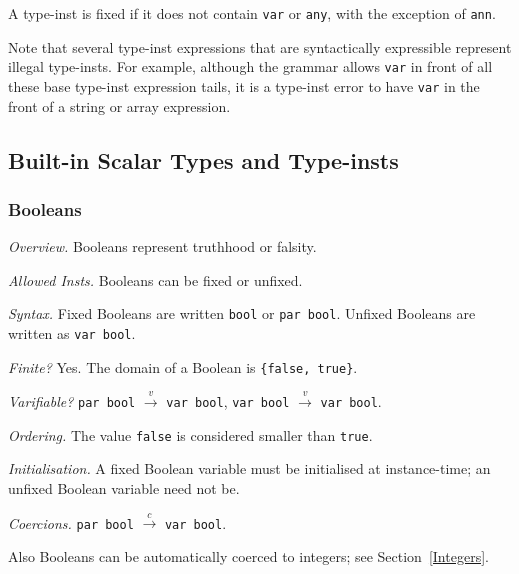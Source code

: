 \documentclass[10pt]{scrartcl}
\newcommand{\TyThing}[1]{\vspace{1.2mm}\noindent\emph{#1} }
\newcommand{\TyOverview}{\TyThing{Overview.}}
\newcommand{\TyInsts}{\TyThing{Allowed Insts.}}
\newcommand{\TySyntax}{\TyThing{Syntax.}}
\newcommand{\TyFiniteType}{\TyThing{Finite?}}
\newcommand{\TyVarifiable}{\TyThing{Varifiable?}}
\newcommand{\TyOrdering}{\TyThing{Ordering.}}
\newcommand{\TyInit}{\TyThing{Initialisation.}}
\newcommand{\TyCoercions}{\TyThing{Coercions.}}
\newcommand{\coerce}[2]{#1 $\stackrel{c}{\rightarrow}$ #2}
\newcommand{\varify}[2]{#1 $\stackrel{v}{\rightarrow}$ #2}
\begin{document}
A type-inst is fixed if it does not contain \texttt{var} or \texttt{any},
with the exception of \texttt{ann}.

Note that several type-inst expressions that are syntactically expressible
represent illegal type-insts.  For example, although the grammar allows
\texttt{var} in front of all these base type-inst expression tails, it is a
type-inst error to have \texttt{var} in the front of a string or array
expression.

\subsection{Built-in Scalar Types and Type-insts}
     \label{Built-in Scalar Types}
\subsubsection{Booleans}
\TyOverview
Booleans represent truthhood or falsity.  

\TyInsts
Booleans can be fixed or unfixed.

\TySyntax
Fixed Booleans are written \texttt{bool} or \texttt{par bool}.  Unfixed
Booleans are written as \texttt{var bool}.

\TyFiniteType
Yes.  The domain of a Boolean is \texttt{\{false, true\}}.

\TyVarifiable
\varify{\texttt{par bool}}{\texttt{var bool}},
\varify{\texttt{var bool}}{\texttt{var bool}}.

\TyOrdering
The value \texttt{false} is considered smaller than \texttt{true}.

\TyInit
A fixed Boolean variable must be initialised at instance-time;  an unfixed
Boolean variable need not be.

\TyCoercions
\coerce{\texttt{par bool}}{\texttt{var bool}}.

Also Booleans can be automatically coerced to integers; see
Section~\ref{Integers}.  
\end{document}

